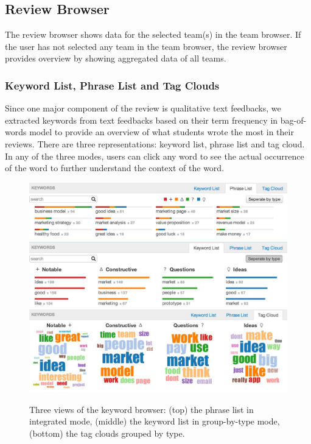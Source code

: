 \documentclass{sigchi}
\begin{document}
\subsection{Review Browser}

The review browser shows data for the selected team(s) in the team browser. If
the user has not selected any team in the team browser, the review browser provides overview by showing aggregated data of all teams.

\subsubsection{Keyword List, Phrase List and Tag Clouds}

Since one major component of the review is qualitative text feedbacks,
we extracted keywords from text feedbacks based on their term frequency in bag-of-
words model \cite{bag-of-words} to provide an overview of what students
wrote the most in their reviews.
There are three representations: keyword list, phrase list and tag cloud.
In any of the three modes, users can click any word to see the actual occurrence of the word to further understand the context of the word.


\begin{figure}[]
\centering
\includegraphics[width=1.4\columnwidth]{images/phrase-list}
\includegraphics[width=1.4\columnwidth]{images/keyword-list}
\includegraphics[width=1.4\columnwidth]{images/clouds}
\caption{Three views of the keyword browser:
(top) the phrase list in integrated mode,
(middle) the keyword list in group-by-type mode,
(bottom) the tag clouds grouped by type.}
\label{fig:keyword-lists}
\end{figure}
\end{document}
